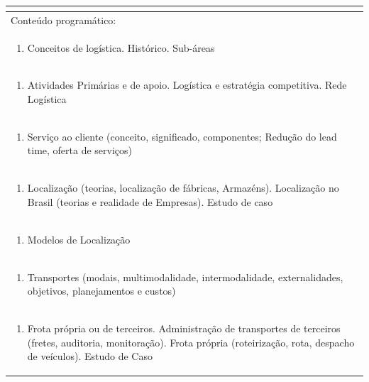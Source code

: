 \documentclass[11pt]{article}
\begin{document}
\begin{center}
\begin{longtable}{|p{4cm}|p{4cm}|p{4cm}|p{4cm}|}
\multicolumn{4}{|p{16cm}|}{}\\
\hline
\multicolumn{4}{|p{16cm}|}{Conteúdo programático:}\\*
\multicolumn{4}{|p{\dimexpr 16cm + 6\tabcolsep\relax}|}{\begin{enumerate}[start=1]\item Conceitos de logística. Histórico. Sub-áreas\end{enumerate}}\\
\multicolumn{4}{|p{\dimexpr 16cm + 6\tabcolsep\relax}|}{\begin{enumerate}[start=2]\item Atividades Primárias e de apoio. Logística e estratégia competitiva. Rede Logística\end{enumerate}}\\
\multicolumn{4}{|p{\dimexpr 16cm + 6\tabcolsep\relax}|}{\begin{enumerate}[start=3]\item Serviço ao cliente (conceito, significado, componentes; Redução do lead time, oferta de serviços)\end{enumerate}}\\
\multicolumn{4}{|p{\dimexpr 16cm + 6\tabcolsep\relax}|}{\begin{enumerate}[start=4]\item Localização (teorias, localização de fábricas, Armazéns). Localização no Brasil (teorias e realidade de Empresas). Estudo de caso\end{enumerate}}\\
\multicolumn{4}{|p{\dimexpr 16cm + 6\tabcolsep\relax}|}{\begin{enumerate}[start=5]\item Modelos de Localização\end{enumerate}}\\
\multicolumn{4}{|p{\dimexpr 16cm + 6\tabcolsep\relax}|}{\begin{enumerate}[start=6]\item Transportes (modais, multimodalidade, intermodalidade, externalidades, objetivos, planejamentos e custos)\end{enumerate}}\\
\multicolumn{4}{|p{\dimexpr 16cm + 6\tabcolsep\relax}|}{\begin{enumerate}[start=7]\item Frota própria ou de terceiros. Administração de transportes de terceiros (fretes, auditoria, monitoração). Frota própria (roteirização, rota, despacho de veículos). Estudo de Caso\end{enumerate}}\\

\end{longtable}
\end{center}
\end{document}
